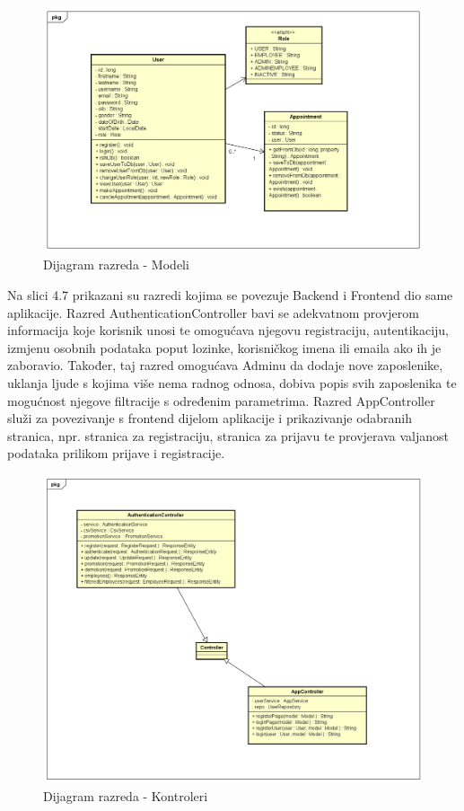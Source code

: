 			\begin{figure}[H]
				\includegraphics[scale=0.5]{slike/modeli}
				\centering
				\caption{Dijagram razreda - Modeli}
			\end{figure}
			
			\newpage
			
			Na slici 4.7 prikazani su razredi kojima se povezuje Backend i Frontend dio same aplikacije. Razred AuthenticationController bavi se adekvatnom provjerom informacija koje korisnik unosi te omogućava njegovu registraciju, autentikaciju, izmjenu osobnih podataka poput lozinke, korisničkog imena ili emaila ako ih je zaboravio. Također, taj razred omogućava Adminu da dodaje nove zaposlenike, uklanja ljude s kojima više nema radnog odnosa, dobiva popis svih zaposlenika te mogućnost njegove filtracije s određenim parametrima. Razred AppController služi za povezivanje s frontend dijelom aplikacije i prikazivanje odabranih stranica, npr. stranica za registraciju, stranica za prijavu te provjerava valjanost podataka prilikom prijave i registracije.
			
			\begin{figure}[H]
				\includegraphics[scale=0.5]{slike/kontroleri}
				\centering
				\caption{Dijagram razreda - Kontroleri}
			\end{figure}
			
